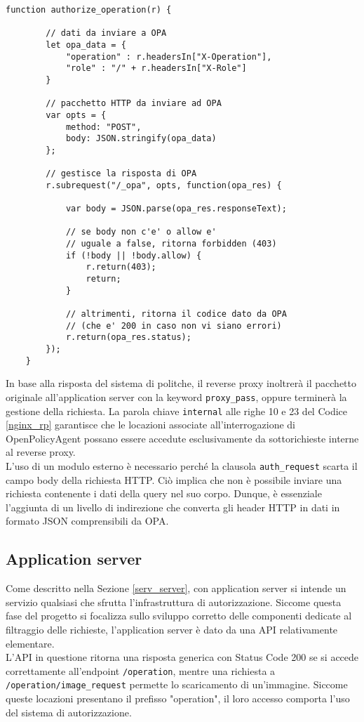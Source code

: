 \begin{lstlisting}[caption={Frammento di codice del modulo NJS},captionpos=b,label=NJS]
    function authorize_operation(r) {

        // dati da inviare a OPA
        let opa_data = {
            "operation" : r.headersIn["X-Operation"],
            "role" : "/" + r.headersIn["X-Role"]
        }
    
        // pacchetto HTTP da inviare ad OPA
        var opts = {
            method: "POST",
            body: JSON.stringify(opa_data)
        };
        
        // gestisce la risposta di OPA
        r.subrequest("/_opa", opts, function(opa_res) {
    
            var body = JSON.parse(opa_res.responseText);
            
            // se body non c'e' o allow e' 
            // uguale a false, ritorna forbidden (403)
            if (!body || !body.allow) {
                r.return(403);
                return;
            }

            // altrimenti, ritorna il codice dato da OPA 
            // (che e' 200 in caso non vi siano errori)
            r.return(opa_res.status);
        });
    }
\end{lstlisting}
In base alla risposta del sistema di politche, il reverse proxy inoltrerà il pacchetto originale all'application server con la keyword \texttt{proxy\_pass}, 
oppure terminerà la gestione della richiesta.
La parola chiave \texttt{internal} alle righe 10 e 23 del Codice \ref{nginx_rp}  garantisce che le locazioni 
associate all'interrogazione di OpenPolicyAgent possano essere accedute esclusivamente da sottorichieste interne al reverse proxy. 
\\ L'uso di un modulo esterno è necessario perché la clausola \texttt{auth\_request} scarta il campo body della 
richiesta HTTP. Ciò implica che non è possibile inviare una richiesta contenente i dati della query nel suo corpo.
Dunque, è essenziale l'aggiunta di un livello di indirezione che converta gli header HTTP in dati in formato
JSON comprensibili da OPA. 


\subsection{Application server}
Come descritto nella Sezione \ref*{serv_server}, con application server si intende un servizio qualsiasi che sfrutta 
l'infrastruttura di autorizzazione. 
Siccome questa fase del progetto si focalizza sullo sviluppo corretto delle componenti dedicate 
al filtraggio delle richieste, l'application server è dato da una API relativamente elementare. \\
L'API in questione ritorna una risposta generica con Status Code 200 se si accede correttamente all'endpoint \texttt{/operation}, 
mentre una richiesta a \texttt{/operation/image\_request} permette lo scaricamento di 
un'immagine. Siccome queste locazioni presentano il prefisso "operation", il loro accesso comporta l'uso 
del sistema di autorizzazione.  

